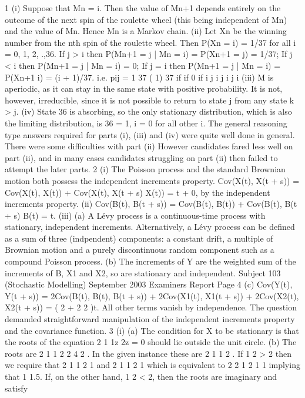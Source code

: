 \documentclass[a4paper,12pt]{article}
\begin{document}
\begin{enumerate}
1 (i) Suppose that Mn = i. Then the value of Mn+1 depends entirely on the outcome
of the next spin of the roulette wheel (this being independent of Mn) and the
value of Mn. Hence Mn is a Markov chain.
(ii) Let Xn be the winning number from the nth spin of the roulette wheel. Then
P(Xn = i) = 1/37 for all i = 0, 1, 2, .,36.
If j > i then P(Mn+1 = j | Mn = i) = P(Xn+1 = j) = 1/37;
If j < i then P(Mn+1 = j | Mn = i) = 0;
If j = i then P(Mn+1 = j | Mn = i) = P(Xn+1 i) = (i + 1)/37.
i.e. pij =
1
37
( 1)
37
if
if
0 if
i
j i
j i
j i
(iii) M is aperiodic, as it can stay in the same state with positive probability. It is
not, however, irreducible, since it is not possible to return to state j from any
state k > j.
(iv) State 36 is absorbing, so the only stationary distribution, which is also the
limiting distribution, is 36 = 1, i = 0 for all other i.
The general reasoning type answers required for parts (i), (iii) and (iv) were quite well done in
general. There were some difficulties with part (ii) However candidates fared less well on part (ii),
and in many cases candidates struggling on part (ii) then failed to attempt the later parts.
2 (i) The Poisson process and the standard Brownian motion both possess the
independent increments property.
Cov(X(t), X(t + s)) = Cov(X(t), X(t)) + Cov(X(t), X(t + s) X(t)) = t + 0, by
the independent increments property.
(ii) Cov(B(t), B(t + s)) = Cov(B(t), B(t)) + Cov(B(t), B(t + s) B(t) = t.
(iii) (a) A Lévy process is a continuous-time process with stationary,
independent increments. Alternatively, a Lévy process can be defined
as a sum of three (indpendent) components: a constant drift, a multiple
of Brownian motion and a purely discontinuous random component
such as a compound Poisson process.
(b) The increments of Y are the weighted sum of the increments of B, X1
and X2, so are stationary and independent.
Subject 103 (Stochastic Modelling) September 2003 Examiners Report
Page 4
(c) Cov(Y(t), Y(t + s)) = 2Cov(B(t), B(t), B(t + s)) + 2Cov(X1(t),
X1(t + s)) + 2Cov(X2(t), X2(t + s)) = ( 2 + 2 2 )t. All other terms
vanish by independence.
The question demanded straightforward manipulation of the independent increments
property and the covariance function.
3 (i) (a) The condition for X to be stationary is that the roots of the equation
2
1 1z 2z = 0
should lie outside the unit circle.
(b) The roots are
2
1 1 2
2
4
2
.
In the given instance these are 2
1 1 2 .
If 1
2 > 2 then we require that
2
1 1 2 1 and 2
1 1 2 1
which is equivalent to
2 2
1 2 1 1
implying that 1 1.5.
If, on the other hand, 1
2 < 2, then the roots are imaginary and satisfy

\end{enumerate}
\end{document}

